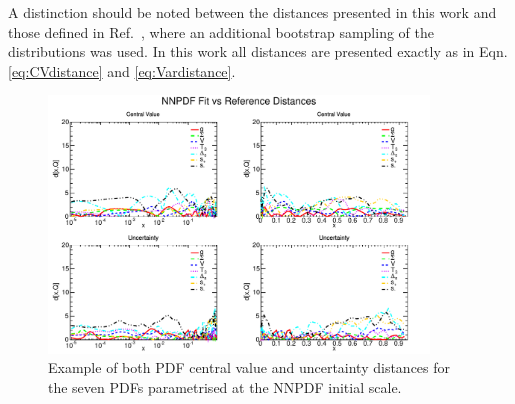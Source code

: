 \documentclass[12pt,oneside,openright]{report}
\begin{document}
\begin{spacing}{1.5}
A distinction should be noted between the distances presented in this work and those defined in Ref.~\cite{Ball:2010de}, where an additional bootstrap sampling of the distributions was used. In this work all distances are presented exactly as in Eqn. \ref{eq:CVdistance} and \ref{eq:Vardistance}.

\begin{figure}[ht]
\centering
\includegraphics[width=0.9\textwidth]{7-PostLHC/figs/EVOLvs23BASIS/distances_evol.pdf}
\caption[Example plot of PDF distances.]{Example of both PDF central value and uncertainty distances for the seven PDFs parametrised at the NNPDF initial scale.}
\label{fig:distance example}
\end{figure}




\cleardoublepage
{}
\renewcommand{\bibname}{Publications}
\begin{thebibliography}{10}


\end{thebibliography}
\end{spacing}
\end{document}
